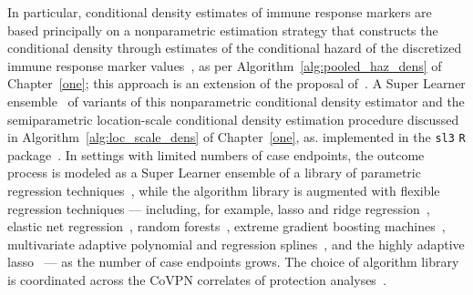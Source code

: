 In particular, conditional density estimates of immune response markers are
based principally on a nonparametric estimation strategy that constructs the
conditional density through estimates of the conditional hazard of the
discretized immune response marker values~\citep{hejazi2020efficient,
hejazi2021haldensify}, as per Algorithm~\ref{alg:pooled_haz_dens} of
Chapter~\ref{one}; this approach is an extension of the proposal
of~\citet{diaz2011super}. A Super Learner ensemble~\citep{vdl2007super} of
variants of this nonparametric conditional density estimator and the
semiparametric location-scale conditional density estimation procedure discussed
in Algorithm~\ref{alg:loc_scale_dens} of Chapter~\ref{one}, as. implemented in
the \texttt{sl3} \texttt{R} package~\citep{coyle2021sl3}. In settings with
limited numbers of case endpoints, the outcome process is modeled as a Super
Learner ensemble of a library of parametric regression
techniques~\citep[per][]{gruber2010application}, while the algorithm library is
augmented with flexible regression techniques --- including, for example, lasso
and ridge regression~\citep{tibshirani1996regression, tikhonov1977solutions,
hoerl1970ridge}, elastic net regression~\citep{zou2003regression,
friedman2009glmnet}, random forests~\citep{breiman2001random, wright2017ranger},
extreme gradient boosting machines~\citep{chen2016xgboost}, multivariate
adaptive polynomial and regression splines~\citep{friedman1991multivariate,
stone1994use, kooperberg1997polychotomous}, and the highly adaptive
lasso~\citep{vdl2017generally, benkeser2016highly, hejazi2020hal9001,
coyle2021hal9001} --- as the number of case endpoints grows. The choice of
algorithm library is coordinated across the CoVPN correlates of protection
analyses~\citep{gilbert2021covpn}.


